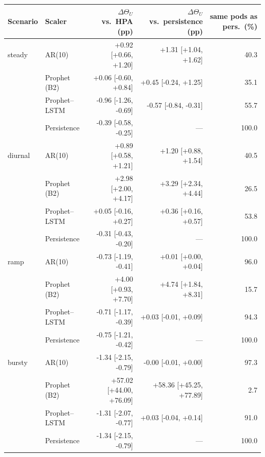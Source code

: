 \begin{tabular}{@{}llrrr@{}}\toprule
Scenario & Scaler & $\Delta\Theta_U$ vs.\ HPA (pp) & $\Delta\Theta_U$ vs.\ persistence (pp) & same pods as pers.\ (\%) \\ \midrule
steady & AR(10) & +0.92 [+0.66, +1.20] & +1.31 [+1.04, +1.62] & 40.3 \\
 & Prophet (B2) & +0.06 [-0.60, +0.84] & +0.45 [-0.24, +1.25] & 35.1 \\
 & Prophet--LSTM & -0.96 [-1.26, -0.69] & -0.57 [-0.84, -0.31] & 55.7 \\
 & Persistence & -0.39 [-0.58, -0.25] & --- & 100.0 \\
\midrule
diurnal & AR(10) & +0.89 [+0.58, +1.21] & +1.20 [+0.88, +1.54] & 40.5 \\
 & Prophet (B2) & +2.98 [+2.00, +4.17] & +3.29 [+2.34, +4.44] & 26.5 \\
 & Prophet--LSTM & +0.05 [-0.16, +0.27] & +0.36 [+0.16, +0.57] & 53.8 \\
 & Persistence & -0.31 [-0.43, -0.20] & --- & 100.0 \\
\midrule
ramp & AR(10) & -0.73 [-1.19, -0.41] & +0.01 [+0.00, +0.04] & 96.0 \\
 & Prophet (B2) & +4.00 [+0.93, +7.70] & +4.74 [+1.84, +8.31] & 15.7 \\
 & Prophet--LSTM & -0.71 [-1.17, -0.39] & +0.03 [-0.01, +0.09] & 94.3 \\
 & Persistence & -0.75 [-1.21, -0.42] & --- & 100.0 \\
\midrule
bursty & AR(10) & -1.34 [-2.15, -0.79] & -0.00 [-0.01, +0.00] & 97.3 \\
 & Prophet (B2) & +57.02 [+44.00, +76.09] & +58.36 [+45.25, +77.89] & 2.7 \\
 & Prophet--LSTM & -1.31 [-2.07, -0.77] & +0.03 [-0.04, +0.14] & 91.0 \\
 & Persistence & -1.34 [-2.15, -0.79] & --- & 100.0 \\
\bottomrule\end{tabular}
